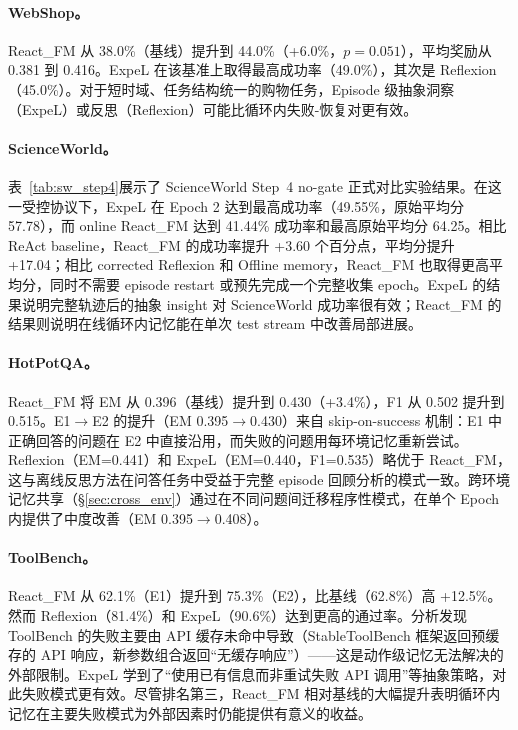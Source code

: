 \documentclass[11pt,a4paper]{article}
\newcommand{\method}{React\_FM}
\begin{document}
\paragraph{WebShop。} \method{} 从 38.0\%（基线）提升到 44.0\%（+6.0\%，$p{=}0.051$），平均奖励从 0.381 到 0.416。ExpeL 在该基准上取得最高成功率（49.0\%），其次是 Reflexion（45.0\%）。对于短时域、任务结构统一的购物任务，Episode 级抽象洞察（ExpeL）或反思（Reflexion）可能比循环内失败-恢复对更有效。

\paragraph{ScienceWorld。} 表~\ref{tab:sw_step4}展示了 ScienceWorld Step~4 no-gate 正式对比实验结果。在这一受控协议下，ExpeL 在 Epoch 2 达到最高成功率（49.55\%，原始平均分 57.78），而 online \method{} 达到 41.44\% 成功率和最高原始平均分 64.25。相比 ReAct baseline，\method{} 的成功率提升 +3.60 个百分点，平均分提升 +17.04；相比 corrected Reflexion 和 Offline memory，\method{} 也取得更高平均分，同时不需要 episode restart 或预先完成一个完整收集 epoch。ExpeL 的结果说明完整轨迹后的抽象 insight 对 ScienceWorld 成功率很有效；\method{} 的结果则说明在线循环内记忆能在单次 test stream 中改善局部进展。

\paragraph{HotPotQA。} \method{} 将 EM 从 0.396（基线）提升到 0.430（+3.4\%），F1 从 0.502 提升到 0.515。E1$\to$E2 的提升（EM 0.395$\to$0.430）来自 skip-on-success 机制：E1 中正确回答的问题在 E2 中直接沿用，而失败的问题用每环境记忆重新尝试。Reflexion（EM=0.441）和 ExpeL（EM=0.440，F1=0.535）略优于 \method{}，这与离线反思方法在问答任务中受益于完整 episode 回顾分析的模式一致。跨环境记忆共享（\S\ref{sec:cross_env}）通过在不同问题间迁移程序性模式，在单个 Epoch 内提供了中度改善（EM 0.395$\to$0.408）。

\paragraph{ToolBench。} \method{} 从 62.1\%（E1）提升到 75.3\%（E2），比基线（62.8\%）高 +12.5\%。然而 Reflexion（81.4\%）和 ExpeL（90.6\%）达到更高的通过率。分析发现 ToolBench 的失败主要由 API 缓存未命中导致（StableToolBench 框架返回预缓存的 API 响应，新参数组合返回``无缓存响应''）——这是动作级记忆无法解决的外部限制。ExpeL 学到了``使用已有信息而非重试失败 API 调用''等抽象策略，对此失败模式更有效。尽管排名第三，\method{} 相对基线的大幅提升表明循环内记忆在主要失败模式为外部因素时仍能提供有意义的收益。
\end{document}
